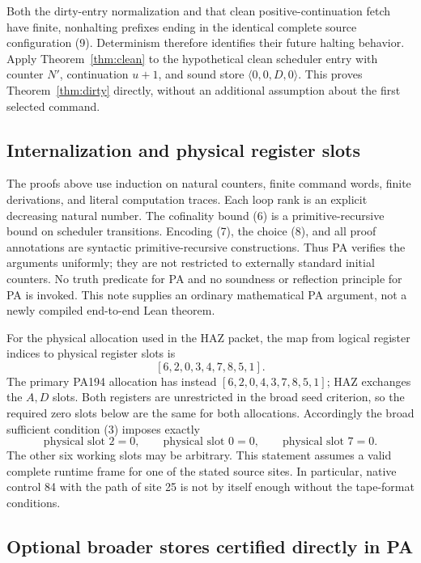 Both the dirty-entry normalization and that clean positive-continuation
fetch have finite, nonhalting prefixes ending in the identical complete
source configuration (9). Determinism therefore identifies their future
halting behavior. Apply Theorem~\ref{thm:clean} to the hypothetical clean
scheduler entry with counter $N'$, continuation $u+1$, and sound store
$\langle0,0,D,0\rangle$. This proves Theorem~\ref{thm:dirty} directly,
without an additional assumption about the first selected command.

\subsection{Internalization and physical register slots}

The proofs above use induction on natural counters, finite command words,
finite derivations, and literal computation traces. Each loop rank is an
explicit decreasing natural number. The cofinality bound (6) is a
primitive-recursive bound on scheduler transitions. Encoding (7), the
choice (8), and all proof annotations are syntactic primitive-recursive
constructions. Thus PA verifies the arguments uniformly; they are not
restricted to externally standard initial counters. No truth predicate
for PA and no soundness or reflection principle for PA is invoked.
This note supplies an ordinary mathematical PA argument, not a newly
compiled end-to-end Lean theorem.

For the physical allocation used in the HAZ packet, the map from logical
register indices to physical register slots is
\[
                    [6,2,0,3,4,7,8,5,1].
\]
The primary PA194 allocation has instead
$[6,2,0,4,3,7,8,5,1]$; HAZ exchanges the $A,D$ slots. Both registers
are unrestricted in the broad seed criterion, so the required zero
slots below are the same for both allocations.
Accordingly the broad sufficient condition (3) imposes exactly
\[
 \text{physical slot }2=0,\qquad
 \text{physical slot }0=0,\qquad
 \text{physical slot }7=0.
\]
The other six working slots may be arbitrary. This statement assumes a
valid complete runtime frame for one of the stated source sites. In
particular, native control 84 with the path of site 25 is not by itself
enough without the tape-format conditions.

\subsection{Optional broader stores certified directly in PA}

